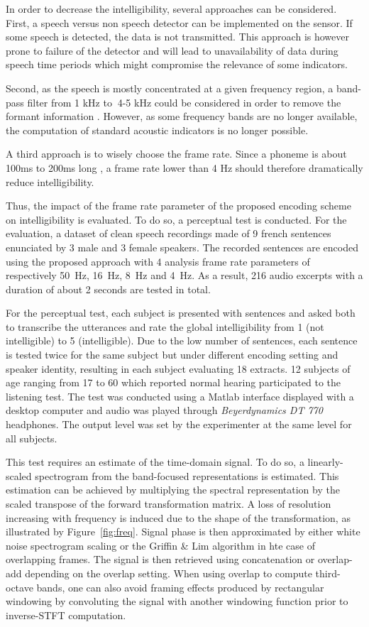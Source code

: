 \documentclass[sensors,article,submit,moreauthors,pdftex,10pt,a4paper]{mdpi}
\begin{document}
In order to decrease the intelligibility, several approaches can be considered. First,  a speech versus non speech detector can be implemented on the sensor. If some speech is detected, the data is not transmitted. This approach is however prone to failure of the detector and will lead to unavailability of data during speech time periods which might compromise the relevance of some indicators.

Second, as the speech is mostly concentrated at a given frequency region, a band-pass filter from 1 kHz to $~$4-5 kHz could be considered in order to remove the formant information \cite{kent1992acoustic}. However, as some frequency bands are no longer available, the computation of standard acoustic indicators is no longer possible.

A third approach is to wisely choose the frame rate. Since a phoneme is about 100ms to 200ms long \cite{kuwabara1996acoustic} \cite{rosen1992temporal}, a frame rate lower than 4 Hz should therefore dramatically reduce intelligibility.

Thus, the impact of the frame rate parameter of the proposed encoding scheme on intelligibility is evaluated. To do so, a perceptual test is conducted. For the evaluation, a dataset of clean speech recordings made of 9 french sentences enunciated by 3 male and 3 female speakers. The recorded sentences are encoded using the proposed approach with 4 analysis frame rate parameters of respectively 50~Hz, 16~Hz, 8~Hz and 4~Hz. As a result, 216 audio excerpts with a duration of about 2 seconds are tested in total.

For the perceptual test, each subject is presented with sentences and asked both to transcribe the utterances and rate the global intelligibility from 1 (not intelligible) to 5 (intelligible). Due to the low number of sentences, each sentence is tested twice for the same subject but under different encoding setting and speaker identity, resulting in each subject evaluating 18 extracts. 12 subjects of age ranging from 17 to 60 which reported normal hearing participated to the listening test. The test was conducted using a Matlab interface displayed with a desktop computer and audio was played through \textit{Beyerdynamics DT 770} headphones. The output level was set by the experimenter at the same level for all subjects.

This test requires an estimate of the time-domain signal. To do so, a linearly-scaled spectrogram from the band-focused representations is estimated. This estimation can be achieved by multiplying the spectral representation by the scaled transpose of the forward transformation matrix. A loss of resolution increasing with frequency is induced due to the shape of the transformation, as illustrated by Figure~\ref{fig:freq}. Signal phase is then approximated by either white noise spectrogram scaling or the Griffin \& Lim algorithm \cite{griffin1984} in hte case of overlapping frames. The signal is then retrieved using concatenation or overlap-add depending on the overlap setting. When using overlap to compute third-octave bands, one can also avoid framing effects produced by rectangular windowing by convoluting the signal with another windowing function prior to inverse-STFT computation.
\end{document}
